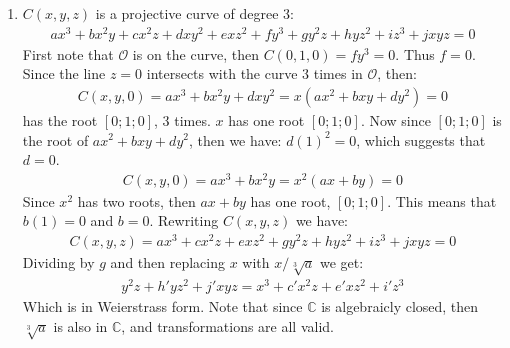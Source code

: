 \begin{enumerate}[label=]
    \item 
        $C(x, y, z)$ is a projective curve of degree 3:
        \begin{gather*}
            ax^3 + bx^2y + cx^2z + dxy^2 + exz^2 + fy^3 + gy^2z + hyz^2 + iz^3 + j xyz = 0    
        \end{gather*}
        First note that $\mathcal O$ is on the curve, then $C(0, 1, 0) = fy^3 = 0$. Thus $f = 0$.
        Since the line $z = 0$ intersects with the curve 3 times in $\mathcal O$, then:
        \begin{gather*}
            C(x, y, 0) = ax^3 + bx^2y + dxy^2 = x(ax^2 + bxy + dy^2) = 0
        \end{gather*}
        has the root $[0; 1; 0]$, 3 times. $x$ has one root $[0; 1; 0]$. Now since $[0; 1; 0]$ is the root of $ax^2 + bxy + dy^2$, then we have: $d(1)^2 = 0$, which suggests that $d = 0$.
        \begin{gather*}
            C(x, y, 0) = ax^3 + bx^2y = x^2 (ax + by) = 0
        \end{gather*}
        Since $x^2$ has two roots, then $ax + by$ has one root, $[0; 1; 0]$. This means that $b(1) = 0$ and $b = 0$. Rewriting $C(x, y, z)$ we have:
        \begin{gather*}
            C(x, y, z) = ax^3 + cx^2z + exz^2 + gy^2z + hyz^2 + iz^3 + jxyz = 0
        \end{gather*} 
        Dividing by $g$ and then replacing $x$ with $x / \sqrt[3]{a}$ we get:
        \begin{gather*}
            y^2z + h'yz^2 + j'xyz = x^3 + c'x^2z + e'xz^2 + i'z^3
        \end{gather*}
        Which is in Weierstrass form. Note that since $\mathbb C$ is algebraicly closed, then $\sqrt[3]{a}$ is also in $\mathbb C$, and transformations are all valid.
\end{enumerate}